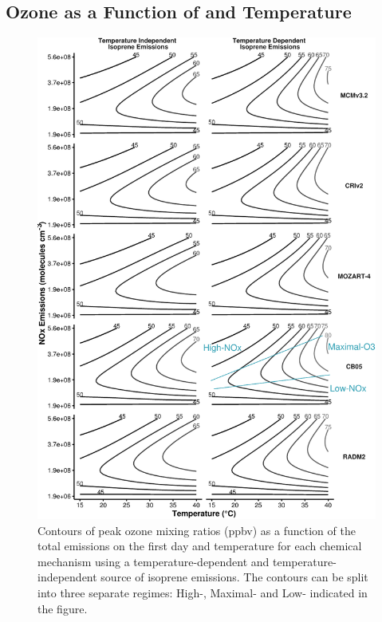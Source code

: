 \subsection[Ozone as a Function of NOx and Temperature]{Ozone as a Function of  and Temperature} \label{ss:r_contours} 
\begin{figure}%
    \centering%
    \caption{Contours of peak ozone mixing ratios (ppbv) as a function of the total  emissions on the first day and temperature for each chemical mechanism using a temperature-dependent and temperature-independent source of isoprene emissions. The contours can be split into three separate regimes: High-, Maximal- and Low- indicated in the figure.}
    \label{f:ozone_contours}%
    \includegraphics[width=\textwidth]{img/O3_comparison}%
\end{figure}

